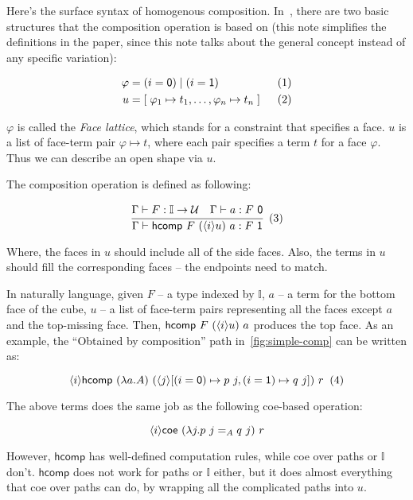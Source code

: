 Here's the surface syntax of homogenous composition.
In~\cite{CCHM}, there are two basic structures that the composition operation
is based on (this note simplifies the definitions in the paper,
since this note talks about the general concept instead of any specific variation):

\begin{align*}
  \varphi &= (i=\textsf 0) \mid (i=\textsf 1)
  & \xtag \\
  u &= [ \; \varphi_1 \mapsto t_1,
      \dots, \varphi_n \mapsto t_n \; ]
  & \xtag
\end{align*}

$\varphi$ is called the \textit{Face lattice},
which stands for a constraint that specifies a face.
$u$ is a list of face-term pair $\varphi \mapsto t$,
where each pair specifies a term $t$ for a face $\varphi$.
Thus we can describe an open shape via $u$.

The composition operation is defined as following:

\newcommand{\comp}{\textsf{hcomp}}

\[
  \cfrac
  {\Gamma \vdash F : \mathbb I \rightarrow \mathcal U \quad
    \Gamma \vdash a : F \ \textsf 0}
  {\Gamma \vdash \comp~F~(\lrangle i u)~a : F \ \textsf 1}
  \xtag
\]

Where, the faces in $u$ should include all of the
side faces.
Also, the terms in $u$ should fill the corresponding faces --
the endpoints need to match.

In naturally language, given
$F$ -- a type indexed by $\mathbb I$,
$a$ -- a term for the bottom face of the cube,
$u$ -- a list of face-term pairs representing all the faces except
$a$ and the top-missing face.
Then, $\comp~F~(\lrangle i u)~a$ produces the top face.
As an example, the ``Obtained by composition'' path in~\cref{fig:simple-comp}
can be written as:

\[
  \lrangle i \comp~(\lambda a. A)~(\lrangle j [
  (i = \textsf 0) \mapsto p~j, (i = \textsf 1) \mapsto q~j ])~r
  \xtag
\]

The above terms does the same job as the following
\textsf{coe}-based operation:

\[
  \langle i\rangle
  \textsf{coe}~(\lambda j. p~j =_A q~j)~r
\]

However, $\comp$ has well-defined computation rules,
while \textsf{coe} over paths or $\mathbb I$ don't.
$\comp$ does not work for paths or $\mathbb I$ either,
but it does almost everything that \textsf{coe} over paths can do,
by wrapping all the complicated paths into $u$.

